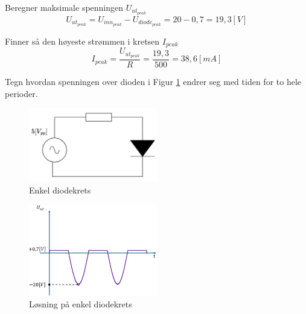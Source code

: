 \vspace{0.5cm} %

\begin{solution}[name=Løsningsforslag oppgave]
Beregner maksimale spenningen $U_{ut_{peak}}$
\[U_{ut_{peak}}=U_{inn_{peak}}-U_{diode_{peak}}=20-0,7=19,3 [V]\]

Finner så den høyeste strømmen i kretsen  $I_{peak}$
\[I_{peak}=\frac{U_{ut_{peak}}}{R}=\frac{19,3}{500}=38,6 [mA]\]

\end{solution}
\vspace{0.5cm} %






\begin{question}[name=Oppgave, topic=dioder]
Tegn hvordan spenningen over dioden i Figur \ref{fig:enklAcDiode} endrer seg med tiden for to hele perioder.
	\begin{figure}[H]
	\centering
	\includegraphics[width=0.5\textwidth]{diode/figurer/ACdiode.png}
	\caption{Enkel diodekrets}
	\label{fig:enklAcDiode}
\end{figure}

\end{question}

\vspace{0.5cm} %

\begin{solution}[name=Løsningsforslag oppgave]
	\begin{figure}[H]
	\centering
	\includegraphics[width=0.5\textwidth]{diode/figurer/ACdiode-LOS.png}
	\caption{Løsning på enkel diodekrets}
	\label{fig:enklAcDiodeLOS}
\end{figure}

\end{solution}
\vspace{0.5cm} %